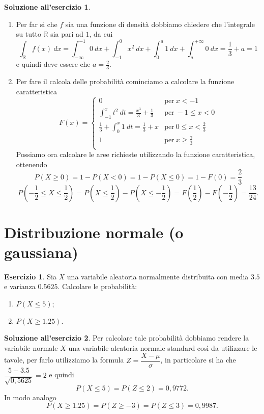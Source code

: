 \documentclass[12pt,a4paper]{article}
\theoremstyle{definition}
\newtheorem{sol}{Soluzione all'esercizio}
\newtheorem{exe}{Esercizio}
\begin{document}
\begin{sol}
	\begin{enumerate}
		\item Per far si che $ f $ sia una funzione di densità dobbiamo chiedere che l'integrale su tutto $ \mathbb{R} $ sia pari ad $ 1 $, da cui
		      \[ \int_{\mathbb{R}} f(x) \ dx = \int_{-\infty}^{-1} 0 \ dx + \int_{-1}^{0} x^2 \ dx + \int_{0}^{a} 1 \ dx + \int_{a}^{+\infty}0 \ dx = \frac13 + a = 1 \]
		      e quindi deve essere che $ a = \frac23. $
		\item Per fare il calcola delle probabilità cominciamo a calcolare la funzione caratteristica
		      \[ F(x) = \begin{cases}
				      0                                               & \text{per} \ x < -1            \\
				      \int_{-1}^{x}t^2 \ dt = \frac{x^3}{3} + \frac13 & \text{per} \ -1 \le x < 0      \\
				      \frac13 + \int_{0}^{x} 1\ dt = \frac13 + x      & \text{per} \ 0 \le x < \frac23 \\
				      1                                               & \text{per} \ x \ge \frac23     \\
			      \end{cases} \]
		      Possiamo ora calcolare le aree richieste utilizzando la funzione caratteristica, ottenendo
		      \[ P(X \ge0) = 1 - P(X <0) = 1 - P(X \le 0) = 1 - F(0) = \frac23 \]
		      \[ P\left(-\frac12 \le X \le \frac12\right) = P\left(X \le \frac12\right) - P\left(X \le -\frac12\right) = F\left(\frac12\right) - F\left(-\frac12\right) = \frac{13}{24}. \]
	\end{enumerate}
\end{sol}


\section{Distribuzione normale (o gaussiana)}

\begin{exe}
	Sia $ X $ una variabile aleatoria normalmente distribuita con media $ 3.5 $ e varianza $ 0.5625 $.
	Calcolare le probabilità:
	\begin{enumerate}
		\item $ P(X \le 5) $;
		\item $ P(X \ge 1.25) $.
	\end{enumerate}
\end{exe}

\begin{sol}
	Per calcolare tale probabilità dobbiamo rendere la variabile normale $ X $ una variabile aleatoria normale standard così da utilizzare le tavole, per farlo utilizziamo la formula $ Z = \dfrac{X - \mu}{\sigma} $, in particolare si ha che $ \dfrac{5 - 3.5}{\sqrt{0,5625}} = 2  $ e quindi
	\[ P(X \le 5) = P(Z \le 2) = 0,9772. \]
	In modo analogo
	\[ P(X \ge 1.25) = P(Z \ge -3) = P(Z \le 3) = 0,9987. \]
\end{sol}
\end{document}
